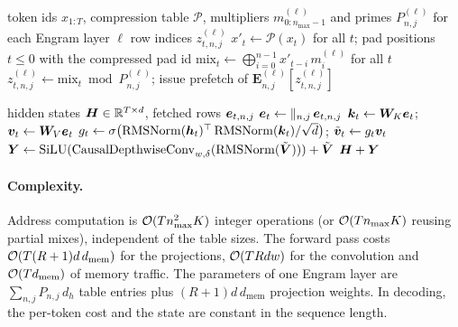 \begin{algorithm}[t]
\caption{Engram address computation (host side, before or during the forward pass)}\label{alg:c10-engram-hash}
\begin{algorithmic}[1]
\Require token ids $x_{1:T}$, compression table $\mathcal{P}$, multipliers $m^{(\ell)}_{0:n_{\max}-1}$ and primes $P^{(\ell)}_{n,j}$ for each Engram layer $\ell$
\Ensure row indices $z^{(\ell)}_{t,n,j}$
\State $x'_t \gets \mathcal{P}(x_t)$ for all $t$; pad positions $t \le 0$ with the compressed pad id
  \State $\mathrm{mix}_t \gets \bigoplus_{i=0}^{n-1} x'_{t-i}\, m^{(\ell)}_i$ for all $t$ 
    \State $z^{(\ell)}_{t,n,j} \gets \mathrm{mix}_t \bmod P^{(\ell)}_{n,j}$; issue prefetch of $\bm{E}^{(\ell)}_{n,j}[z^{(\ell)}_{t,n,j}]$
  \EndFor
\EndFor
\end{algorithmic}
\end{algorithm}

\begin{algorithm}[t]
\caption{Engram layer forward (one residual branch; repeat the gate per branch for mHC)}\label{alg:c10-engram-layer}
\begin{algorithmic}[1]
\Require hidden states $\bm{H} \in \mathbb{R}^{T \times d}$, fetched rows $\bm{e}_{t,n,j}$
\State $\bm{e}_t \gets \Vert_{n,j}\, \bm{e}_{t,n,j}$ 
\State $\bm{k}_t \gets \bm{W}_K\bm{e}_t$;\; $\bm{v}_t \gets \bm{W}_V\bm{e}_t$
\State $g_t \gets \sigma\bigl(\operatorname{RMSNorm}(\bm{h}_t)^{\top}\operatorname{RMSNorm}(\bm{k}_t)/\sqrt{d}\bigr)$;\; $\tilde{\bm{v}}_t \gets g_t \bm{v}_t$
\State $\bm{Y} \gets \operatorname{SiLU}(\mathrm{CausalDepthwiseConv}_{w,\delta}(\operatorname{RMSNorm}(\tilde{\bm{V}}))) + \tilde{\bm{V}}$
\State \Return $\bm{H} + \bm{Y}$ 
\end{algorithmic}
\end{algorithm}

\paragraph{Complexity.} Address computation is $\mathcal{O}(T n_{\max}^2 K)$ integer operations (or
$\mathcal{O}(T n_{\max} K)$ reusing partial mixes), independent of the table sizes. The forward pass
costs $\mathcal{O}(T (R+1) d\, d_{\mathrm{mem}})$ for the projections, $\mathcal{O}(T R d w)$ for the
convolution and $\mathcal{O}(T d_{\mathrm{mem}})$ of memory traffic. The parameters of one Engram layer
are $\sum_{n,j} P_{n,j}\, d_h$ table entries plus $(R+1) d\, d_{\mathrm{mem}}$ projection weights.
In decoding, the per-token cost and the state are constant in the sequence length.

